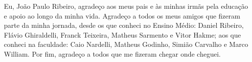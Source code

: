 \begin{agradecimentos}
Eu, João Paulo Ribeiro, agradeço aos meus pais e às minhas irmãs pela educação e apoio ao longo da minha vida. Agradeço a todos os meus amigos que fizeram parte da minha jornada, desde os que conheci no Ensino Médio: Daniel Ribeiro, Flávio Ghiraldelli, Franck Teixeira, Matheus Sarmento e Vitor Hakme; aos que conheci na faculdade: Caio Nardelli, Matheus Godinho, Simião Carvalho e Marco William. Por fim, agradeço a todos que me fizeram chegar onde cheguei.
\end{agradecimentos}
